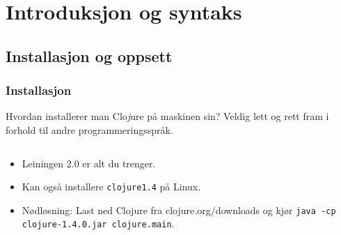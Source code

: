 \documentclass{beamer}
\begin{document}
\section{Introduksjon og syntaks}
\subsection{Installasjon og oppsett}
\begin{frame}
  \frametitle{Installasjon}

  Hvordan installerer man Clo{\em j}ure på maskinen sin? Veldig lett og rett
  fram i forhold til andre programmeringsspråk.

  \begin{columns}
    \begin{column}{0.7\textwidth}
       \begin{itemize}
       \item<2-> Leiningen 2.0 er alt du trenger.
       \item<3-> Kan også installere {\tt clojure1.4} på Linux.
       \item<4-> Nødløsning: Last ned Clojure fra clojure.org/downloads og kjør
         \colorbox{solarbg}{\tt java -cp}
         \colorbox{solarbg}{\tt clojure-1.4.0.jar clojure.main}.
  \end{itemize}
    \end{column}
    \begin{column}{0.3\textwidth}

\end{column}
\end{columns}
\end{frame}
\end{document}
